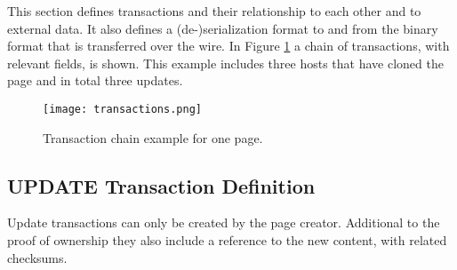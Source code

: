 This section defines transactions and their relationship to each other and to
external data. It also defines a (de-)serialization format to and
from the binary format that is transferred over the wire. In Figure
\ref{fig:transactions} a chain of transactions, with relevant fields, is
shown. This example includes three hosts that have cloned the page and in total
three updates.

\begin{figure}[htp]
\texttt{[image: transactions.png]}
\label{fig:transactions}
\caption{Transaction chain example for one page.}
\end{figure}

\subsection{UPDATE Transaction Definition}

Update transactions can only be created by the page creator. Additional to the
proof of ownership they also include a reference to the new content, with
related checksums.

